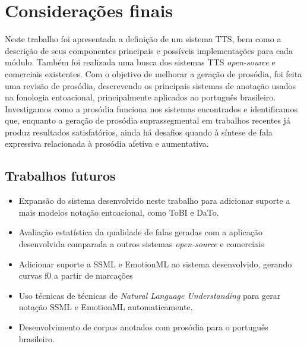 
\chapter{Considerações finais}
Neste trabalho foi apresentada a definição de um sistema TTS, bem como a descrição
de seus componentes principais e possíveis implementações para cada módulo.
Também foi realizada uma busca dos sistemas TTS \emph{open-source} e comerciais
existentes. Com o objetivo de melhorar a geração de prosódia, foi feita uma
revisão de prosódia, descrevendo os principais sistemas de anotação usados na
fonologia entoacional, principalmente aplicados ao português brasileiro.
Investigamos como a prosódia funciona nos sistemas encontrados e identificamos
que, enquanto a geração de prosódia suprassegmental em trabalhos recentes já
produz resultados satisfatórios, ainda há desafios quando à síntese de fala
expressiva relacionada à prosódia afetiva e aumentativa.

\section{Trabalhos futuros}
\begin{itemize}
\item Expansão do sistema desenvolvido neste trabalho para adicionar suporte a
  mais modelos notação entoacional, como ToBI e DaTo.
\item Avaliação estatística da qualidade de falas geradas com a aplicação desenvolvida comparada a outros sistemas \emph{open-source} e comerciais
\item Adicionar suporte a SSML e EmotionML ao sistema desenvolvido, gerando
  curvas f0 a partir de marcações
\item Uso técnicas de técnicas de \emph{Natural Language Understanding} para
  gerar notação SSML e EmotionML automaticamente.
\item Desenvolvimento de corpus anotados com prosódia para o português brasileiro.
\end{itemize}

